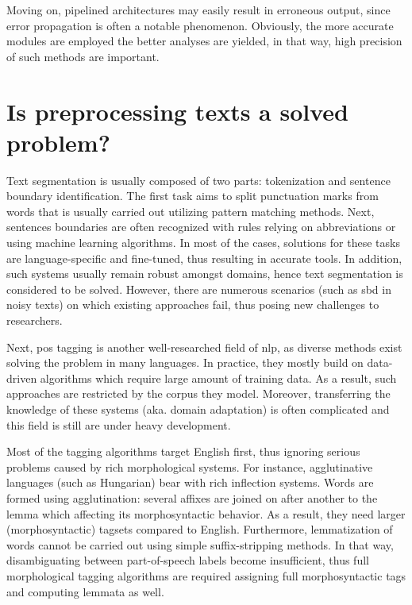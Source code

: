 Moving on, pipelined architectures may easily result in erroneous output, since error propagation is often a notable phenomenon. 
Obviously, the more accurate modules are employed the better analyses are yielded, in that way, high precision of such methods are important.

\section{Is preprocessing texts a solved problem?}



Text segmentation is usually composed of two parts: tokenization and sentence boundary identification. 
The first task aims to split punctuation marks from words that is usually carried out utilizing pattern matching methods.
Next, sentences boundaries are often recognized with rules relying on abbreviations or using machine learning algorithms.
In most of the cases, solutions for these tasks are language-specific and fine-tuned, thus resulting in accurate tools.
In addition, such systems usually remain robust amongst domains, hence text segmentation is considered to be solved.
However, there are numerous scenarios (such as \acrshort{sbd} in noisy texts) on which existing approaches fail, thus posing new challenges to researchers.

Next, \acrshort{pos} tagging is another well-researched field of \acrshort{nlp}, as diverse methods exist solving the problem in many languages. 
In practice, they mostly build on data-driven algorithms which require large amount of training data.
As a result, such approaches are restricted by the corpus they model.
Moreover, transferring the knowledge of these systems (aka. domain adaptation) is often complicated and this field is still are under heavy development.

Most of the tagging algorithms target English first, thus ignoring serious problems caused by rich morphological systems.
For instance, agglutinative languages (such as Hungarian) bear with rich inflection systems.
Words are formed using agglutination: several affixes are joined on after another to the lemma which affecting its morphosyntactic behavior.
As a result, they need larger (morphosyntactic) tagsets compared to English. 
Furthermore, lemmatization of words cannot be carried out using simple suffix-stripping methods.
In that way, disambiguating between part-of-speech labels become insufficient, thus full morphological tagging algorithms are required assigning full morphosyntactic tags and computing lemmata as well.

